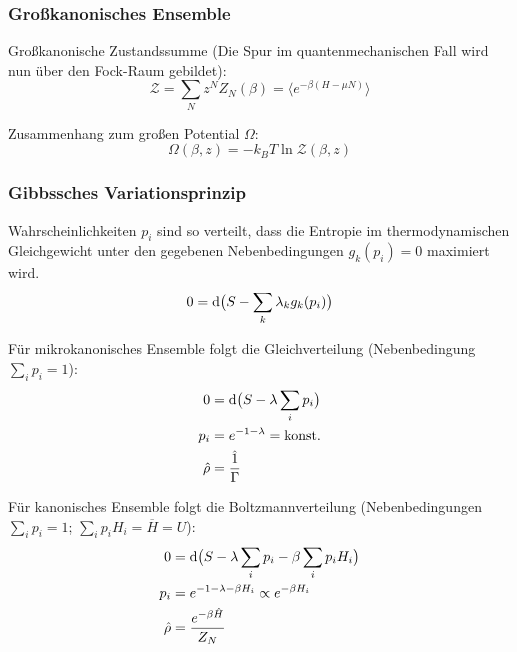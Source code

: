 		\subsubsection{Großkanonisches Ensemble}
			\noindent
			Großkanonische Zustandssumme (Die Spur im quantenmechanischen Fall wird nun über den Fock-Raum gebildet):
			\begin{equation}
				\mathcal{Z} = \sum_N z^N Z_N(\beta) = \langle e^{-\beta(H-\mu N)} \rangle
			\end{equation}

			\noindent
			Zusammenhang zum großen Potential $\Omega$:
			\begin{equation}
				\Omega(\beta,z) = -k_B T \ln \mathcal{Z}(\beta,z)
			\end{equation}


		\subsubsection{Gibbssches Variationsprinzip}
			\noindent
			Wahrscheinlichkeiten $p_i$ sind so verteilt, dass die Entropie im thermodynamischen Gleichgewicht unter den gegebenen Nebenbedingungen $g_k(p_i) = 0$ maximiert wird.
			\begin{equation}
				0 = \mathrm{d} \big( S - \sum_k \lambda_k g_k(p_i) \big)
			\end{equation}

			\noindent
			Für mikrokanonisches Ensemble folgt die Gleichverteilung (Nebenbedingung $\sum_i p_i = 1$):
			\begin{equation}
				\begin{aligned}
					0 &= \diff \big( S - \lambda \sum_i p_i \big) \\
					p_i &= e^{-1-\lambda} = \konst \\
					\hat{\rho} &= \frac{\hat{1}}{\Gamma} \\ %
				\end{aligned}
			\end{equation}

			\noindent
			Für kanonisches Ensemble folgt die Boltzmannverteilung (Nebenbedingungen $\sum_i p_i = 1$; $\sum_i p_i H_i = \overline{H} = U$):
			\begin{equation}
				\begin{aligned}
					0 &= \mathrm{d} \big( S - \lambda \sum_i p_i - \beta \sum_i p_i H_i \big) \\
					p_i &= e^{-1-\lambda-\beta H_i} \propto e^{-\beta H_i} \\
					\hat{\rho} &= \frac{e^{-\beta \hat{H}}}{Z_N} \\
				\end{aligned}
			\end{equation}

